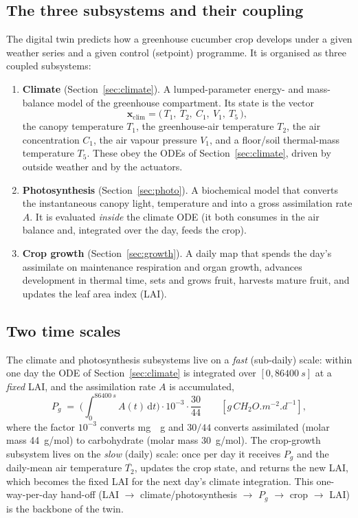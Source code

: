 \documentclass[11pt,a4paper]{article}
\newcommand{\Tcan}{T_{1}}
\newcommand{\Tair}{T_{2}}
\newcommand{\Cair}{C_{1}}
\newcommand{\Vair}{V_{1}}
\newcommand{\Tflo}{T_{5}}
\begin{document}
\subsection{The three subsystems and their coupling}
The digital twin predicts how a greenhouse cucumber crop develops under a given weather series and
a given control (setpoint) programme. It is organised as three coupled subsystems:

\begin{enumerate}[leftmargin=2.2em]
  \item \textbf{Climate} (Section~\ref{sec:climate}). A lumped-parameter energy- and mass-balance
  model of the greenhouse compartment. Its state is the vector
  \begin{equation}
    \mathbf{x}_{\text{clim}} = \big(\,\Tcan,\ \Tair,\ \Cair,\ \Vair,\ \Tflo\,\big),
  \end{equation}
  the canopy temperature $\Tcan$, the greenhouse-air temperature $\Tair$, the air
   concentration $\Cair$, the air vapour pressure $\Vair$, and a floor/soil thermal-mass
  temperature $\Tflo$. These obey the ODEs of Section~\ref{sec:climate}, driven by outside weather
  and by the actuators.
  \item \textbf{Photosynthesis} (Section~\ref{sec:photo}). A biochemical model that converts the
  instantaneous canopy light, temperature and  into a gross assimilation rate $A$. It is
  evaluated \emph{inside} the climate ODE (it both consumes  in the air balance and,
  integrated over the day, feeds the crop).
  \item \textbf{Crop growth} (Section~\ref{sec:growth}). A daily map that spends the day's
  assimilate on maintenance respiration and organ growth, advances development in thermal time,
  sets and grows fruit, harvests mature fruit, and updates the leaf area index (LAI).
\end{enumerate}

\subsection{Two time scales}
The climate and photosynthesis subsystems live on a \emph{fast} (sub-daily) scale: within one day
the ODE of Section~\ref{sec:climate} is integrated over $[0,\SI{86400}{s}]$ at a \emph{fixed} LAI,
and the assimilation rate $A$ is accumulated,
\begin{equation}
  P_g \;=\; \Big(\!\int_{0}^{\SI{86400}{s}}\! A(t)\,\mathrm{d}t\Big)\cdot 10^{-3}\cdot\frac{30}{44}
  \qquad [\si{g\,CH_2O.m^{-2}.d^{-1}}],
  \label{eq:Pg}
\end{equation}
where the factor $10^{-3}$ converts \si{mg\to g} and $30/44$ converts assimilated 
(molar mass \SI{44}{g/mol}) to carbohydrate  (molar mass \SI{30}{g/mol}). The crop-growth
subsystem lives on the \emph{slow} (daily) scale: once per day it receives $P_g$ and the daily-mean
air temperature $\overline{\Tair}$, updates the crop state, and returns the new LAI, which becomes
the fixed LAI for the next day's climate integration. This one-way-per-day hand-off (LAI $\to$
climate/photosynthesis $\to$ $P_g$ $\to$ crop $\to$ LAI) is the backbone of the twin.
\end{document}
